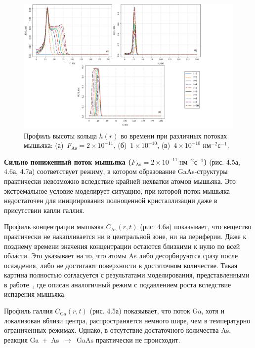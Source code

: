 \documentclass[14pt,oneside]{extarticle}
\begin{document}
\begin{figure}[H]
    \begin{center}
    \includegraphics[width=15cm]{images/h_t_2.png}
    \caption{\label{fig:h_flux_2} Профиль высоты кольца $h(r)$ во времени при различных потоках мышьяка: (а)~$F_{\text{As}} = 2 \times 10^{-11}$, (б)~$1 \times 10^{-10}$, (в)~$4 \times 10^{-10}$ нм$^{-2}$с$^{-1}$.}
    \end{center}
\end{figure}


\textbf{Сильно пониженный поток мышьяка ($F_\mathrm{As} = 2 \times 10^{-11}~\text{нм}^{-2}\text{с}^{-1}$)} (рис. 4.5а, 4.6а, 4.7а) соответствует режиму, в котором образование GaAs-структуры практически невозможно вследствие крайней нехватки атомов мышьяка. Это экстремальное условие моделирует ситуацию, при которой поток мышьяка недостаточен для инициирования полноценной кристаллизации даже в присутствии капли галлия.

Профиль концентрации мышьяка $C_\mathrm{As}(r, t)$ (рис. 4.6а) показывает, что вещество практически не накапливается ни в центральной зоне, ни на периферии. Даже к позднему времени значения концентрации остаются близкими к нулю по всей области. Это указывает на то, что атомы As либо десорбируются сразу после осаждения, либо не достигают поверхности в достаточном количестве. Такая картина полностью согласуется с результатами моделирования, представленными в работе~\cite{fan2023evaporation}, где описан аналогичный режим с подавлением роста вследствие испарения мышьяка.

Профиль галлия $C_\mathrm{Ga}(r, t)$ (рис. 4.5а) показывает, что поток Ga, хотя и локализован вблизи центра, распространяется немного шире, чем в температурно ограниченных режимах. Однако, в отсутствие достаточного количества As, реакция Ga~+~As~$\rightarrow$~GaAs практически не происходит.
\end{document}
